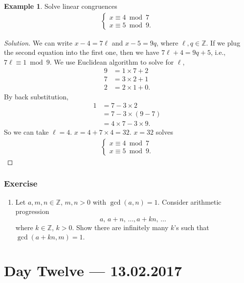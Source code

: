 \documentclass{amsbook}
\theoremstyle{plain}
\theoremstyle{definition}
\newtheorem{example}[theorem]{Example}
\theoremstyle{remark}
\numberwithin{equation}{chapter}
\numberwithin{figure}{chapter}
\newcommand{\Z}{\mathbb{Z}}
\begin{document}
\begin{example}\label{ex:ex3_day11}
  Solve linear congruences 
\begin{align}
  \left\{ \begin{array}{l}
            x \equiv 4 \bmod 7 \\[1mm]
            x \equiv 5 \bmod 9.
          \end{array}\right.
\end{align} 
\end{example}
\begin{proof}[Solution]
  We can write $x - 4 = 7\ell$ and $x - 5 = 9q$, where $\ell, q \in \Z$. If we plug the second equation into the first one, then we have $7\ell + 4 = 9q + 5$, i.e., $7\ell \equiv 1 \bmod 9$.
  We use Euclidean algorithm to solve for $\ell$,
  \begin{align}
    9 &= 1 \times 7 + 2 \\
    7 &= 3 \times 2 + 1 \\
    2 &= 2 \times 1 + 0.
  \end{align}
  By back substitution,
  \begin{align}
    1 &= 7 - 3 \times 2 \\
      &= 7 - 3 \times (9 - 7) \\
      &= 4 \times 7 - 3 \times 9.
  \end{align}
  So we can take $\ell = 4$. $x = 4 + 7 \times 4 = 32$. $x = 32$ solves
  \begin{align}
  \left\{ \begin{array}{l}
            x \equiv 4 \bmod 7 \\[1mm]
            x \equiv 5 \bmod 9.
          \end{array}\right.
\end{align} 
\end{proof}

\subsection*{Exercise}
\begin{enumerate}
\item Let $a, m, n \in \Z$, $m, n > 0$ with $\gcd (a, n) = 1$. Consider arithmetic progression
  \[
    a, \, a + n, \, \ldots , a + kn, \, \ldots 
  \]
  where $k \in \Z$, $k > 0$. Show there are infinitely many $k$'s such that $\gcd (a + k n, m) = 1$.
\end{enumerate}

\chapter[Lecture Twelve]{Day Twelve \hfill {\footnotesize \rm --- 13.02.2017}}
\end{document}
